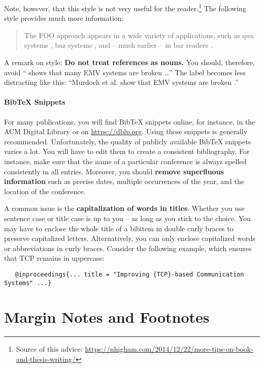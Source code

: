 Note, however, that this style is not very useful for the reader.\footnote{Source of this advice: \url{https://nhigham.com/2014/12/22/more-tips-on-book-and-thesis-writing/}} The following style provides much more information:
\begin{quote}
The FOO approach appears in a wide variety of applications, such as qux systems \cite{murdoch_steven_j._chip_2010}, baz systems \cite{anderson_ross_emv:_2014}, and -- much earlier -- in bar readers \cite{kou_weidong_secure_2003}.
\end{quote}

A remark on style: \textbf{Do not treat references as nouns.} You should, therefore, avoid ``\cite{murdoch_steven_j._chip_2010} shows that many EMV systems are broken \ldots'' The label becomes less distracting like this: ``Murdoch et al. show that EMV systems are broken  \cite{murdoch_steven_j._chip_2010}.''

\paragraph{BibTeX Snippets}

For many publications, you will find BibTeX snippets online, for instance, in the ACM Digital Library or on \url{https://dblp.org}. Using these snippets is generally recommended. Unfortunately, the quality of publicly available BibTeX snippets varies a lot. You will have to edit them to create a consistent bibliography. For instance, make sure that the name of a particular conference is always spelled consistently in all entries. Moreover, you should \textbf{remove superfluous information} such as precise dates, multiple occurrences of the year, and the location of the conference.

A common issue is the \textbf{capitalization of words in titles}. Whether you use sentence case or title case is up to you -- as long as you stick to the choice. You may have to enclose the whole title of a bibitem in double curly braces to preserve capitalized letters. Alternatively, you can only enclose capitalized words or abbreviations in curly braces. Consider the following example, which ensures that TCP remains in uppercase:
\begin{verbatim}
   @inproceedings{... title = "Improving {TCP}-based Communication Systems" ...}
\end{verbatim}

\section{Margin Notes and Footnotes}

